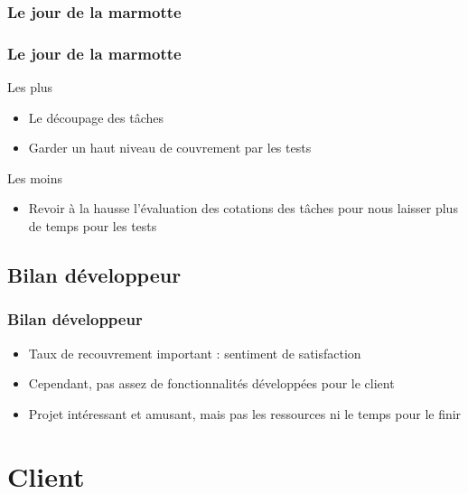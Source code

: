 \documentclass{beamer}
\begin{document}
      \subsubsection{Le jour de la marmotte}
      \begin{frame}
        \frametitle{Le jour de la marmotte}
        \begin{block}{Les plus}
          \begin{itemize}
            \item Le découpage des tâches
            \item Garder un haut niveau de couvrement par les tests
          \end{itemize}
        \end{block}
        \begin{block}{Les moins}
          \begin{itemize}
            \item Revoir à la hausse l'évaluation des cotations des tâches pour nous laisser plus de temps pour les tests
          \end{itemize}
        \end{block}
      \end{frame}
      
    \subsection{Bilan développeur}
    \begin{frame}
      \frametitle{Bilan développeur}
      \begin{block}{}
        \begin{itemize}
          \item Taux de recouvrement important : sentiment de satisfaction
          \item Cependant, pas assez de fonctionnalités développées pour le client
          \item Projet intéressant et amusant, mais pas les ressources ni le temps pour le finir
        \end{itemize}
      \end{block}
    \end{frame}
    
  \section{Client}
  
\end{document}
